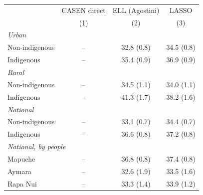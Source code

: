 \begin{tabular}{lccc}
\toprule
 & CASEN direct & ELL (Agostini) & LASSO \\
 & (1) & (2) & (3) \\
\midrule
\multicolumn{4}{l}{\textit{Urban}} \\
\quad Non-indigenous & -- & 32.8 (0.8) & 34.5 (0.8) \\
\quad Indigenous & -- & 35.4 (0.9) & 36.9 (0.9) \\
\multicolumn{4}{l}{\textit{Rural}} \\
\quad Non-indigenous & -- & 34.5 (1.1) & 34.0 (1.1) \\
\quad Indigenous & -- & 41.3 (1.7) & 38.2 (1.6) \\
\multicolumn{4}{l}{\textit{National}} \\
\quad Non-indigenous & -- & 33.1 (0.7) & 34.4 (0.7) \\
\quad Indigenous & -- & 36.6 (0.8) & 37.2 (0.8) \\
\multicolumn{4}{l}{\textit{National, by people}} \\
\quad Mapuche & -- & 36.8 (0.8) & 37.4 (0.8) \\
\quad Aymara & -- & 32.6 (1.9) & 33.5 (1.6) \\
\quad Rapa Nui & -- & 33.3 (1.4) & 33.9 (1.2) \\
\bottomrule
\end{tabular}
